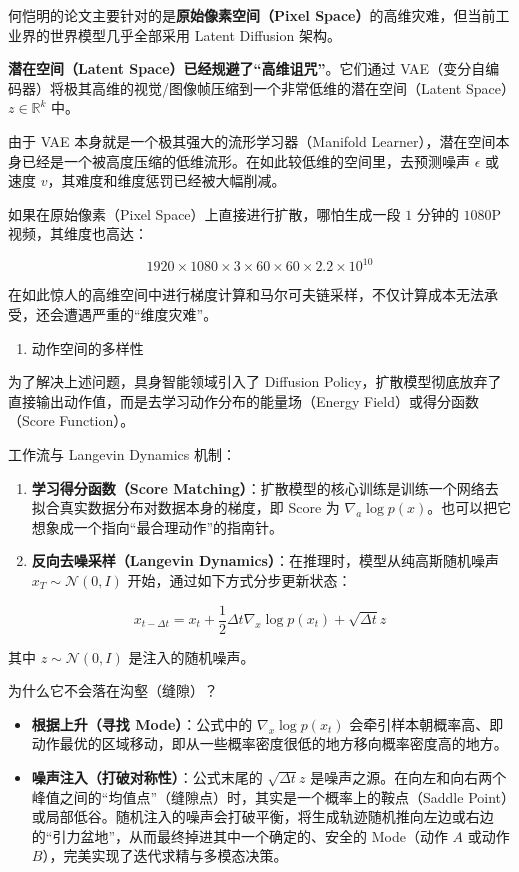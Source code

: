 何恺明的论文主要针对的是\textbf{原始像素空间（Pixel Space）}的高维灾难，但当前工业界的世界模型几乎全部采用 Latent Diffusion 架构。

\textbf{潜在空间（Latent Space）已经规避了``高维诅咒''}。它们通过 VAE（变分自编码器）将极其高维的视觉/图像帧压缩到一个非常低维的潜在空间（Latent Space）\(z\in\mathbb{R}^k\) 中。

由于 VAE 本身就是一个极其强大的流形学习器（Manifold Learner），潜在空间本身已经是一个被高度压缩的低维流形。在如此较低维的空间里，去预测噪声 \(\epsilon\) 或速度 \(v\)，其难度和维度惩罚已经被大幅削减。

如果在原始像素（Pixel Space）上直接进行扩散，哪怕生成一段 \(1\) 分钟的 \(1080\)P 视频，其维度也高达：

\[
1920\times1080\times3\times60\times60\times2.2\times10^{10}
\]

在如此惊人的高维空间中进行梯度计算和马尔可夫链采样，不仅计算成本无法承受，还会遭遇严重的``维度灾难''。

\begin{enumerate}
\def\labelenumi{\arabic{enumi}.}
\setcounter{enumi}{1}
\tightlist
\item
  动作空间的多样性
\end{enumerate}

为了解决上述问题，具身智能领域引入了 Diffusion Policy，扩散模型彻底放弃了直接输出动作值，而是去学习动作分布的能量场（Energy Field）或得分函数（Score Function）。

工作流与 Langevin Dynamics 机制：

\begin{enumerate}
\def\labelenumi{\arabic{enumi}.}
\tightlist
\item
  \textbf{学习得分函数（Score Matching）}：扩散模型的核心训练是训练一个网络去拟合真实数据分布对数据本身的梯度，即 Score 为 \(\nabla_a\log p(x)\)。也可以把它想象成一个指向``最合理动作''的指南针。
\item
  \textbf{反向去噪采样（Langevin Dynamics）}：在推理时，模型从纯高斯随机噪声 \(x_T\sim\mathcal{N}(0,I)\) 开始，通过如下方式分步更新状态：
\end{enumerate}

\[
x_{t-\Delta t}=x_t+\frac{1}{2}\Delta t\nabla_x\log p(x_t)+\sqrt{\Delta t}z
\]

其中 \(z\sim\mathcal{N}(0,I)\) 是注入的随机噪声。

为什么它不会落在沟壑（缝隙）？

\begin{itemize}
\tightlist
\item
  \textbf{根据上升（寻找 Mode）}：公式中的 \(\nabla_x\log p(x_t)\) 会牵引样本朝概率高、即动作最优的区域移动，即从一些概率密度很低的地方移向概率密度高的地方。
\item
  \textbf{噪声注入（打破对称性）}：公式末尾的 \(\sqrt{\Delta t}z\) 是噪声之源。在向左和向右两个峰值之间的``均值点''（缝隙点）时，其实是一个概率上的鞍点（Saddle Point）或局部低谷。随机注入的噪声会打破平衡，将生成轨迹随机推向左边或右边的``引力盆地''，从而最终掉进其中一个确定的、安全的 Mode（动作 \(A\) 或动作 \(B\)），完美实现了迭代求精与多模态决策。
\end{itemize}

